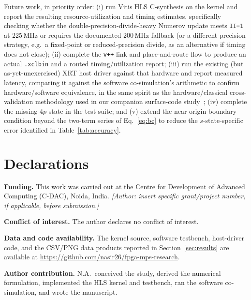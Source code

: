 \documentclass[pdflatex,sn-mathphys,Numbered]{sn-jnl}
\begin{document}
Future work, in priority order: (i) run Vitis HLS C-synthesis on the kernel and report the resulting resource-utilization and timing estimates, specifically checking whether the double-precision-divide-heavy Numerov update meets \texttt{II=1} at 225\,MHz or requires the documented 200\,MHz fallback (or a different precision strategy, e.g.\ a fixed-point or reduced-precision divide, as an alternative if timing does not close); (ii) complete the \texttt{v++} link and place-and-route flow to produce an actual \texttt{.xclbin} and a routed timing/utilization report; (iii) run the existing (but as-yet-unexercised) XRT host driver against that hardware and report measured latency, comparing it against the software co-simulation's arithmetic to confirm hardware/software equivalence, in the same spirit as the hardware/classical cross-validation methodology used in our companion surface-code study~\cite{ali_surface_code}; (iv) complete the missing $4p$ state in the test suite; and (v) extend the near-origin boundary condition beyond the two-term series of Eq.~\eqref{eq:bc} to reduce the $s$-state-specific error identified in Table~\ref{tab:accuracy}.

\backmatter

\section*{Declarations}

\textbf{Funding.} This work was carried out at the Centre for Development of Advanced Computing (C-DAC), Noida, India. \emph{[Author: insert specific grant/project number, if applicable, before submission.]}

\textbf{Conflict of interest.} The author declares no conflict of interest.

\textbf{Data and code availability.} The kernel source, software testbench, host-driver code, and the CSV/PNG data products reported in Section~\ref{sec:results} are available at \url{https://github.com/nasir26/fpga-mps-research}.

\textbf{Author contribution.} N.A.\ conceived the study, derived the numerical formulation, implemented the HLS kernel and testbench, ran the software co-simulation, and wrote the manuscript.
\end{document}
